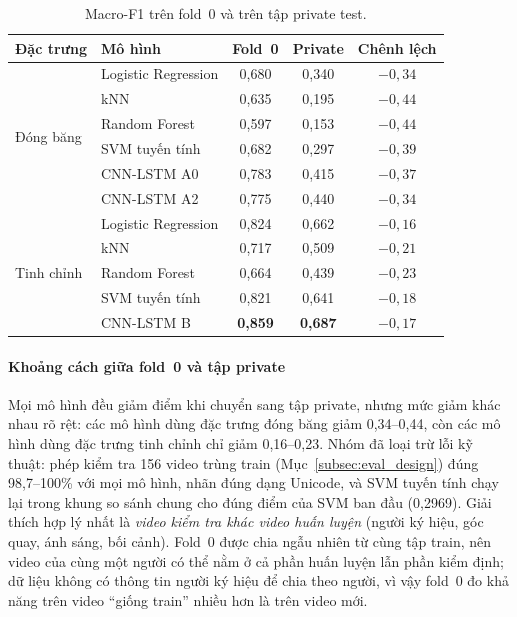\begin{table}[H]
  \centering
  \caption{Macro-F1 trên fold~0 và trên tập private test.}
  \label{tab:res_private}
  \small
  \begin{tabular}{@{}llccc@{}}
    \toprule
    \textbf{Đặc trưng} & \textbf{Mô hình} & \textbf{Fold~0} & \textbf{Private} & \textbf{Chênh lệch} \\
    \midrule
    \multirow{6}{*}{Đóng băng} & Logistic Regression & 0,680 & 0,340 & $-0{,}34$ \\
     & kNN & 0,635 & 0,195 & $-0{,}44$ \\
     & Random Forest & 0,597 & 0,153 & $-0{,}44$ \\
     & SVM tuyến tính & 0,682 & 0,297 & $-0{,}39$ \\
     & CNN-LSTM A0 & 0,783 & 0,415 & $-0{,}37$ \\
     & CNN-LSTM A2 & 0,775 & 0,440 & $-0{,}34$ \\
    \midrule
    \multirow{5}{*}{Tinh chỉnh} & Logistic Regression & 0,824 & 0,662 & $-0{,}16$ \\
     & kNN & 0,717 & 0,509 & $-0{,}21$ \\
     & Random Forest & 0,664 & 0,439 & $-0{,}23$ \\
     & SVM tuyến tính & 0,821 & 0,641 & $-0{,}18$ \\
     & CNN-LSTM B & \textbf{0,859} & \textbf{0,687} & $-0{,}17$ \\
    \bottomrule
  \end{tabular}
\end{table}

\paragraph*{Khoảng cách giữa fold~0 và tập private} Mọi mô hình đều giảm điểm khi chuyển sang tập private, nhưng mức giảm khác nhau rõ rệt: các mô hình dùng đặc trưng đóng băng giảm 0,34--0,44, còn các mô hình dùng đặc trưng tinh chỉnh chỉ giảm 0,16--0,23. Nhóm đã loại trừ lỗi kỹ thuật: phép kiểm tra 156 video trùng train (Mục~\ref{subsec:eval_design}) đúng 98,7--100\% với mọi mô hình, nhãn đúng dạng Unicode, và SVM tuyến tính chạy lại trong khung so sánh chung cho đúng điểm của SVM ban đầu (0,2969). Giải thích hợp lý nhất là \emph{video kiểm tra khác video huấn luyện} (người ký hiệu, góc quay, ánh sáng, bối cảnh). Fold~0 được chia ngẫu nhiên từ cùng tập train, nên video của cùng một người có thể nằm ở cả phần huấn luyện lẫn phần kiểm định; dữ liệu không có thông tin người ký hiệu để chia theo người, vì vậy fold~0 đo khả năng trên video ``giống train'' nhiều hơn là trên video mới.

